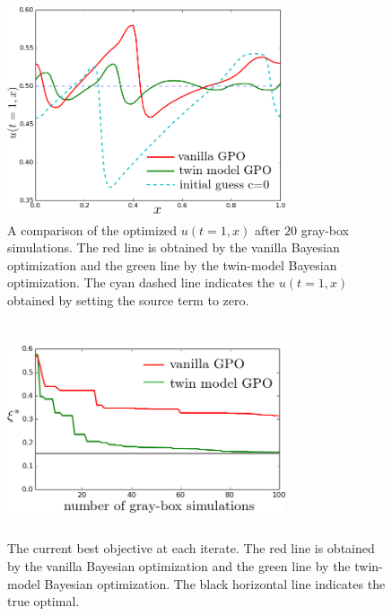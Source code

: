 \begin{figure}[htbp]\begin{center}
    \includegraphics[width=8.2cm,height=6.3cm]{../finalutx.png}
    \caption{A comparison of the optimized $u(t=1,x)$ after $20$ gray-box simulations.
             The red line is obtained by the vanilla Bayesian optimization and the green line by the
             twin-model Bayesian optimization. The cyan dashed line indicates the $u(t=1,x)$ 
             obtained by setting the source term to zero.
             }
    \label{fig: u t=1 BL}
\end{center}\end{figure}

\begin{figure}[htbp]\begin{center}
    \includegraphics[width=8.2cm,height=6.3cm]{../opt_BL.png}
    \caption{The current best objective at each iterate. The red line is obtained by the vanilla 
             Bayesian optimization and the green line by the twin-model Bayesian optimization.
             The black horizontal line indicates the true optimal.}
    \label{fig: current best BL}
\end{center}\end{figure}


